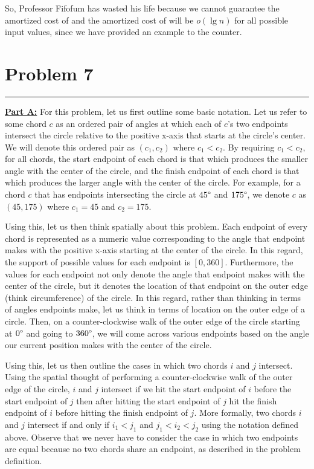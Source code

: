 \documentclass[11pt]{article}
\def\separateline{\medskip\hrule\medskip}
\begin{document}
So, Professor Fifofum has wasted his life because we cannot guarantee the amortized cost of  and the amortized cost of  will be $o(\lg{n})$ for all possible input values, since we have provided an example to the counter.

\newpage

\section{Problem 7}
\separateline

\textbf{\underline{Part A:}} For this problem, let us first outline some basic notation. Let us refer to some chord $c$ as an ordered pair of angles at which each of $c$'s two endpoints intersect the circle relative to the positive x-axis that starts at the circle's center. We will denote this ordered pair as $(c_1, c_2)$ where $c_1 < c_2$. By requiring $c_1 < c_2$, for all chords, the start endpoint of each chord is that which produces the smaller angle with the center of the circle, and the finish endpoint of each chord is that which produces the larger angle with the center of the circle. For example, for a chord $c$ that has endpoints intersecting the circle at $45 \degree$ and $175 \degree$, we denote $c$ as $(45,175)$ where $c_1 = 45$ and $c_2 = 175$.

Using this, let us then think spatially about this problem. Each endpoint of every chord is represented as a numeric value corresponding to the angle that endpoint makes with the positive x-axis starting at the center of the circle. In this regard, the support of possible values for each endpoint is $[0,360]$. Furthermore, the values for each endpoint not only denote the angle that endpoint makes with the center of the circle, but it denotes the location of that endpoint on the outer edge (think circumference) of the circle. In this regard, rather than thinking in terms of angles endpoints make, let us think in terms of location on the outer edge of a circle. Then, on a counter-clockwise walk of the outer edge of the circle starting at $0 \degree$ and going to $360 \degree$, we will come across various endpoints based on the angle our current position makes with the center of the circle.

Using this, let us then outline the cases in which two chords $i$ and $j$ intersect. Using the spatial thought of performing a counter-clockwise walk of the outer edge of the circle, $i$ and $j$ intersect if we hit the start endpoint of $i$ before the start endpoint of $j$ then after hitting the start endpoint of $j$ hit the finish endpoint of $i$ before hitting the finish endpoint of $j$. More formally, two chords $i$ and $j$ intersect if and only if $i_1 < j_1$ and $j_1 < i_2 < j_2$ using the notation defined above. Observe that we never have to consider the case in which two endpoints are equal because no two chords share an endpoint, as described in the problem definition.
\end{document}
